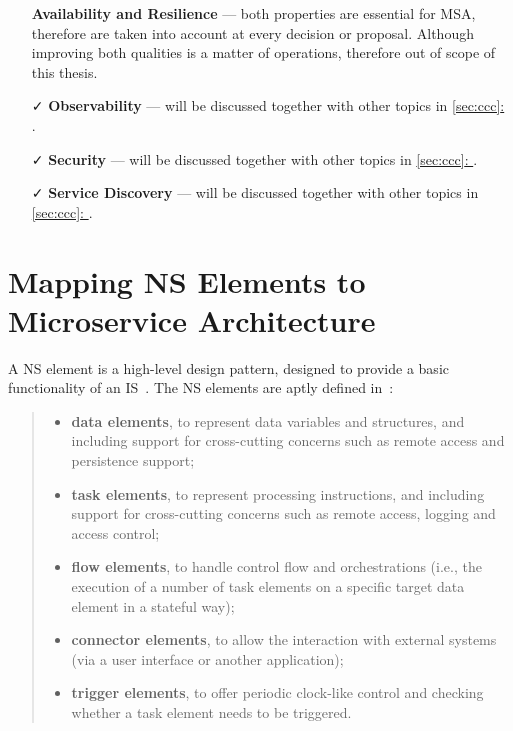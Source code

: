 \documentclass[thesis=M,english,hidelinks]{FITthesis}[2012/10/20]
\newcommand*{\fullref}[1]{\hyperref[{#1}]{\autoref*{#1}: \textit{\nameref*{#1}}}}
\begin{document}
\begin{itemize}[leftmargin=35pt,align=center]
    \item[\faRemove] \textbf{Availability and Resilience} --- both properties are essential for \acrshort{MSA}, therefore are taken into account at every decision or proposal. Although improving both qualities is a matter of operations, therefore out of scope of this thesis.
    \item[\faCheck] \textbf{Observability} --- will be discussed together with other topics in \fullref{sec:ccc}.
    \item[\faCheck] \textbf{Security} --- will be discussed together with other topics in \fullref{sec:ccc}.
    \item[\faCheck] \textbf{Service Discovery} --- will be discussed together with other topics in \fullref{sec:ccc}.
\end{itemize}



\section{Mapping NS Elements to Microservice Architecture}
\label{sec:mapping_ns_elems}

A \acrshort{NS} element is a high-level design pattern, designed to provide a basic functionality of an \acrlong{IS}~\cite{ns-toward-general-theory}. The \acrshort{NS} elements are aptly defined in~\cite{ns-in-practice}:
\begin{quote}
    \begin{itemize}
        \item \textbf{data elements}, to represent data variables and structures, and including support for cross-cutting concerns such as remote access and persistence support;
        \item \textbf{task elements}, to represent processing instructions, and including support for cross-cutting concerns such as remote access, logging and access control;
        \item \textbf{flow elements}, to handle control flow and orchestrations (i.e., the execution of a number of task elements on a specific target data element in a stateful way);
        \item \textbf{connector elements}, to allow the interaction with external systems (via a user interface or another application);
        \item \textbf{trigger elements}, to offer periodic clock-like control and checking whether a task element needs to be triggered.
    \end{itemize}
\end{quote}
\end{document}
